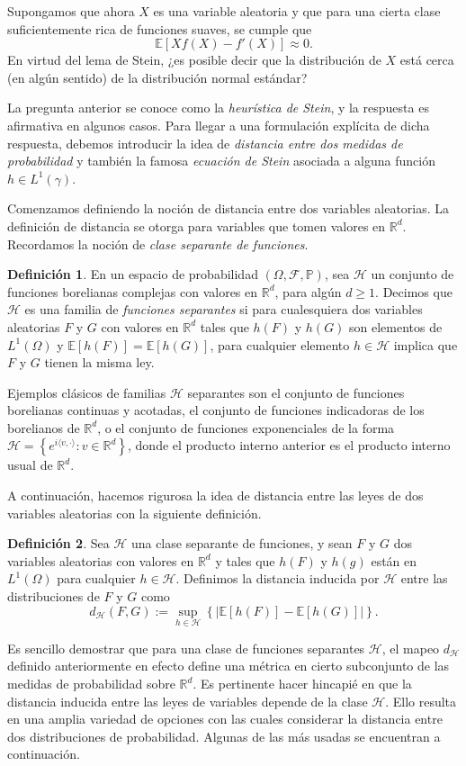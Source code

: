 \documentclass[letterpaper,twoside,12pt]{book}
\newcommand{\R}{\mathbb{R}}
\newcommand{\F}{\mathcal{F}}
\newcommand{\E}{\mathbb{E}}
\renewcommand{\P}{\mathbb{P}}
\newcommand{\1}{\mathds{1}}
\newcommand{\abs}[1]{\left\lvert #1 \right\rvert}
\theoremstyle{definition}
\newtheorem{dfn}{Definición}
\theoremstyle{definition}
\theoremstyle{remark}
\theoremstyle{definition}
\theoremstyle{definition}
\theoremstyle{definition}
\theoremstyle{definition}
\theoremstyle{definition}
\begin{document}
Supongamos que ahora $X$ es una variable aleatoria y que para una cierta clase suficientemente rica de funciones suaves, se cumple que 
\[
\E\left[Xf(X)-f'(X)\right]\approx0.    
\]
En virtud del lema de Stein, ¿es posible decir que la distribución de $X$ está cerca (en algún sentido) de la distribución normal estándar?

La pregunta anterior se conoce como la \textit{heurística de Stein}, y la respuesta es afirmativa en algunos casos. Para llegar a una formulación explícita de dicha respuesta, debemos introducir la idea de \textit{distancia entre dos medidas de probabilidad} y también la famosa \textit{ecuación de Stein} asociada a alguna función $h\in L^1(\gamma)$. 

Comenzamos definiendo la noción de distancia entre dos variables aleatorias. La definición de distancia se otorga para variables que tomen valores en $\R^d$. Recordamos la noción de \textit{clase separante de funciones}.

\begin{dfn} 
 En un espacio de probabilidad $(\Omega, \F, \P)$, sea $\mathscr{H}$ un conjunto de funciones borelianas complejas con valores en $\R^d$, para algún $d\geq1$. Decimos que $\mathscr{H}$ es una familia de \textit{funciones separantes} si para cualesquiera dos variables aleatorias $F$ y $G$ con valores en $\R^{d}$ tales que $h(F)$ y $h(G)$ son elementos de $L^1(\Omega)$ y $\E\left[h(F)\right]=\E\left[h(G)\right]$, para cualquier elemento $h\in \mathscr{H}$ implica que $F$ y $G$ tienen la misma ley.
 \end{dfn}
Ejemplos clásicos de familias $\mathscr{H}$ separantes son el conjunto de funciones borelianas continuas y acotadas, el conjunto de funciones indicadoras de los borelianos de $\R^{d}$, o el conjunto de funciones exponenciales de la forma $\mathscr{H}=\left\{e^{i \langle v,\cdot\rangle}: v\in \R^{d} \right\}$, donde el producto interno anterior es el producto interno usual de $\R^{d}$.

A continuación, hacemos rigurosa la idea de distancia entre las leyes de dos variables aleatorias con la siguiente definición.
\begin{dfn} 
 Sea $\mathscr{H}$ una clase separante de funciones, y sean $F$ y $G$ dos variables aleatorias con valores en $\R^{d}$ y tales que $h(F)$ y $h(g)$ están en $L^1(\Omega)$ para cualquier $h\in \mathscr{H}$. Definimos la distancia inducida por $\mathscr{H}$ entre las distribuciones de $F$ y $G$ como 
 \[
 d_\mathscr{H}(F,G):=\sup_{h\in \mathscr{H}}\left\{\abs{\E\left[h(F)\right]-\E\left[h(G)\right]}\right\}.
 \]
 \end{dfn}
Es sencillo demostrar que para una clase de funciones separantes $\mathscr{H}$, el mapeo $d_\mathscr{H}$ definido anteriormente en efecto define una métrica en cierto subconjunto de las medidas de probabilidad sobre $\R^{d}$. Es pertinente hacer hincapié en que la distancia inducida entre las leyes de variables depende de la clase $\mathscr{H}$. Ello resulta en una amplia variedad de opciones con las cuales considerar la distancia entre dos distribuciones de probabilidad. Algunas de las más usadas se encuentran a continuación.
\end{document}
